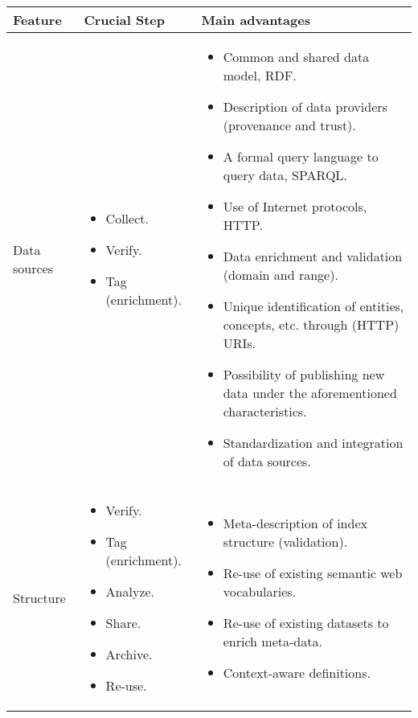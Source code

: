  
\begin{table}[!htb]
\renewcommand{\arraystretch}{1.3}
\scriptsize
\begin{center}
\begin{tabular}{|p{3cm}|p{3cm}|p{6.5cm}|}
\hline
  \textbf{Feature} & \textbf{Crucial Step} &\textbf{Main advantages}  \\  \hline
  Data sources &  \begin{itemize} \item Collect. \item Verify. \item Tag (enrichment).\end{itemize} & \begin{itemize}
		      \item Common and shared data model, RDF.
		      \item Description of data providers (provenance and trust).
		      \item A formal query language to query data, SPARQL.
		      \item Use of Internet protocols, HTTP.
		      \item Data enrichment and validation (domain and range).
		      \item Unique identification of entities, concepts, etc. through (HTTP) URIs.
		      \item Possibility of publishing new data under the aforementioned characteristics.
		      \item Standardization and integration of data sources.
		    \end{itemize} \\ \hline  
  Structure & \begin{itemize} \item Verify. \item Tag (enrichment). \item Analyze. \item Share. \item Archive. \item Re-use. \end{itemize} & \begin{itemize}
                  \item Meta-description of index structure (validation).
                  \item Re-use of existing semantic web vocabularies.
                  \item Re-use of existing datasets to enrich meta-data.
                  \item Context-aware definitions.

\end{itemize}
\end{tabular}
\end{center}
\end{table}

